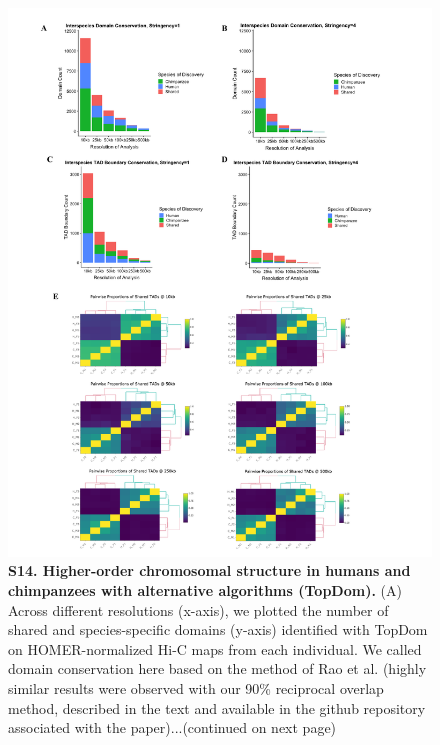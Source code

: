 \begin{figure}[!htb]
\label{fig:ch02-figS13}
\end{figure}

\begin{figure}[!htb]
\centering
\includegraphics[width=5in]{img/figS14.1.pdf}
\caption[Higher-order chromosomal structure in humans and chimpanzees with alternative algorithms (TopDom).]{\textbf{S14. Higher-order chromosomal structure in humans and chimpanzees with alternative algorithms (TopDom).} (A) Across different resolutions (x-axis), we plotted the number of shared and species-specific domains (y-axis) identified with TopDom \cite{Shin.2016} on HOMER-normalized Hi-C maps from each individual. We called domain conservation here based on the method of Rao et al. \cite{Rao.2014} (highly similar results were observed with our 90\% reciprocal overlap method, described in the text and available in the github repository associated with the paper)...(continued on next page)}
\label{fig:ch02-figS14}
\end{figure}

